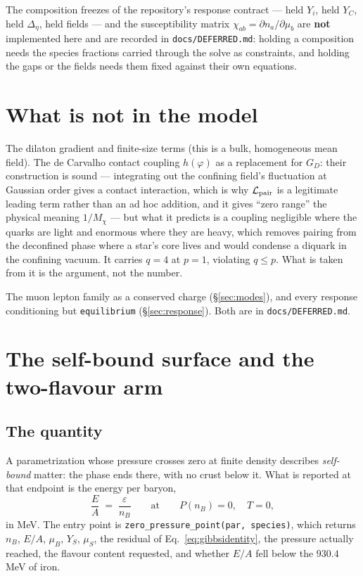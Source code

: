 \documentclass[11pt,a4paper]{article}
\newcommand{\code}[1]{\texttt{#1}}
\begin{document}
The composition freezes of the repository's response contract --- held $Y_i$,
held $Y_C$, held $\Delta_\eta$, held fields --- and the susceptibility matrix
$\chi_{ab}=\partial n_a/\partial\mu_b$ are \textbf{not} implemented here and
are recorded in \code{docs/DEFERRED.md}: holding a composition needs the
species fractions carried through the solve as constraints, and holding the
gaps or the fields needs them fixed against their own equations.

\section{What is not in the model}

The dilaton gradient and finite-size terms (this is a bulk, homogeneous mean
field). The de Carvalho contact coupling $h(\varphi)$ \cite{deCarvalho2010} as
a replacement for $G_D$: their construction is sound --- integrating out the
confining field's fluctuation at Gaussian order gives a contact interaction,
which is why $\mathcal L_{\rm pair}$ is a legitimate leading term rather than
an ad hoc addition, and it gives ``zero range'' the physical meaning $1/M_\chi$
--- but what it predicts is a coupling negligible where the quarks are light
and enormous where they are heavy, which removes pairing from the deconfined
phase where a star's core lives and would condense a diquark in the confining
vacuum. It carries $q=4$ at $p=1$, violating $q\le p$. What is taken from it is
the argument, not the number.

The muon lepton family as a conserved charge (\S\ref{sec:modes}), and every
response conditioning but \code{equilibrium} (\S\ref{sec:response}). Both are
in \code{docs/DEFERRED.md}.

\section{The self-bound surface and the two-flavour arm}
\label{sec:zeropressure}

\subsection{The quantity}

A parametrization whose pressure crosses zero at finite density describes
\emph{self-bound} matter: the phase ends there, with no crust below it. What is
reported at that endpoint is the energy per baryon,
%
\begin{equation}
  \frac{E}{A} \;=\; \frac{\varepsilon}{n_B}
  \qquad\text{at}\qquad P(n_B) = 0,\quad T = 0 ,
\end{equation}
%
in MeV. The entry point is \texttt{zero\_pressure\_point(par, species)}, which
returns $n_B$, $E/A$, $\mu_B$, $Y_S$, $\mu_S$, the residual of
Eq.~\eqref{eq:gibbsidentity}, the pressure actually reached, the flavour
content requested, and whether $E/A$ fell below the $930.4\;$MeV of iron.
\end{document}
